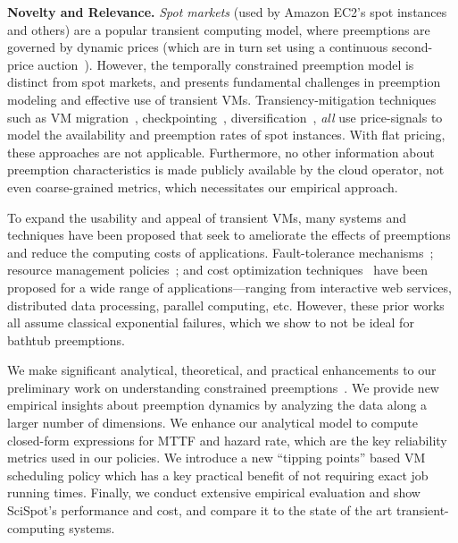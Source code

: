 \noindent \textbf{Novelty and Relevance.}
%
\emph{Spot markets} (used by Amazon EC2's spot instances and others) are a popular transient computing model, where preemptions are governed by dynamic prices (which are in turn set using a continuous second-price auction~\cite{spot-pricing2}).
However, the temporally constrained preemption model is distinct from spot markets, and presents fundamental challenges in preemption modeling and effective use of transient VMs. 
Transiency-mitigation techniques such as VM migration~\cite{spotcheck}, checkpointing~\cite{flint, marathe2014exploiting}, diversification~\cite{exosphere}, \emph{all} use price-signals to model the availability and preemption rates of spot instances. 
With flat pricing, these approaches are not applicable. 
Furthermore, no other information about preemption characteristics is made publicly available by the cloud operator, not even coarse-grained metrics, which necessitates our empirical approach. 


To expand the usability and appeal of transient VMs, many systems and techniques have been proposed that seek to ameliorate the effects of preemptions and reduce the computing costs of applications. 
Fault-tolerance mechanisms~\cite{spotcheck, marathe2014exploiting}; resource management policies~\cite{exosphere, conductor}; and cost optimization techniques~\cite{dubois2016optispot, shastri2017hotspot} have been proposed for a wide range of applications---ranging from interactive web services, distributed data processing, parallel computing, etc.
However, these prior works all assume classical exponential failures, which we show to not be ideal for bathtub preemptions. 


We make significant analytical, theoretical, and practical enhancements to our preliminary work on understanding constrained preemptions~\cite{scispot-hpdc20}. 
We provide new empirical insights about preemption dynamics by analyzing the data along a larger number of dimensions.
We enhance our analytical model to compute closed-form expressions for MTTF and hazard rate, which are the key reliability metrics used in our policies. 
We introduce a new ``tipping points'' based VM scheduling policy which has a key practical benefit of not requiring exact job running times. 
Finally, we conduct extensive empirical evaluation and show SciSpot's performance and cost, and compare it to the state of the art transient-computing systems. 



